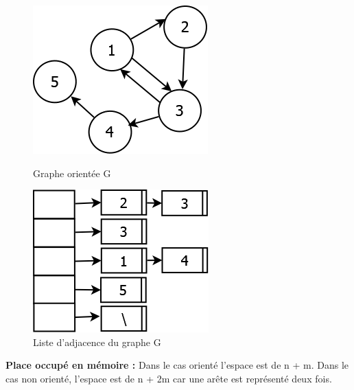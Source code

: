 \begin{figure}[H]
	\begin{minipage}[c]{.46\linewidth}
	\begin{center}
		\includegraphics[height=100 pt, width=110 pt]{./ressources/image/graphAdjace.png} 
		\caption{Graphe orientée G}
		\label{grapAdjac2}
	\end{center}
	\end{minipage} 
	\begin{minipage}[c]{.46\linewidth}
	\begin{center}
		\includegraphics[height=110 pt, width=140 pt]{./ressources/image/listeAdjace.png} 
		\caption{Liste d'adjacence du graphe G}
		\label{listeAdjac}
	\end{center}
	\end{minipage} 
\end{figure}


\textbf{Place occupé en mémoire :} Dans le cas orienté l'espace est de n + m. Dans le cas non orienté, l'espace est de n + 2m car une arête est représenté deux fois.